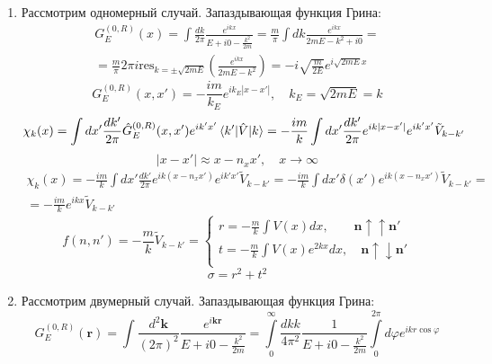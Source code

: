 \documentclass[12pt]{article}
\theoremstyle{definition}
\begin{document}
\begin{enumerate}
    \item Рассмотрим одномерный случай. Запаздывающая функция Грина:
    \begin{multline}
    G^{(0,R)}_E(x)=\int\frac{dk}{2\pi}\frac{e^{ikx}}{E+i0-\frac{k^2}{2m}}=\frac{m}{\pi}\int dk\frac{e^{ikx}}{2mE-k^2+i0}=\\=\frac{m}{\pi}2\pi i\text{res}_{k=\pm\sqrt{2mE}}\left(\frac{e^{ikx}}{2mE-k^2}\right)=-i\sqrt{\frac{m}{2E}}e^{i\sqrt{2mE}x}
    \end{multline}
    \begin{equation}
        G^{(0,R)}_E(x,x')=-\frac{im}{k_E}e^{ik_E|x-x'|},\quad k_E=\sqrt{2mE}=k
    \end{equation}
    \begin{equation}
        \chi_k(x)=\int dx'\frac{dk'}{2\pi}\hat{G}^{(0,R)}_E(x,x')e^{ik'x'}\braket{k'|\hat{V}|k}=-\frac{im}{k}\int dx'\frac{dk'}{2\pi}e^{ik|x-x'|}e^{ik'x'}\tilde{V}_{k-k'}
    \end{equation}
    \begin{equation}
        |x-x'|\approx x-n_xx',\quad x\rightarrow\infty
    \end{equation}
    \begin{multline}
        \chi_k(x)=-\frac{im}{k}\int dx'\frac{dk'}{2\pi}e^{ik(x-n_xx')}e^{ik'x'}\tilde{V}_{k-k'}=-\frac{im}{k}\int dx'\delta(x')e^{ik(x-n_xx')}\tilde{V}_{k-k'}=\\=-\frac{im}{k}e^{ikx}\tilde{V}_{k-k'}
    \end{multline}
    \begin{equation}
        \boxed{f(n,n')=-\frac{m}{k}\tilde{V}_{k-k'}=
        \begin{cases}
            r=-\frac{m}{k}\int V(x)dx,\quad\quad \textbf{n}\uparrow\uparrow\textbf{n}'\\
            t=-\frac{m}{k}\int V(x)e^{2kx}dx,\quad \textbf{n}\uparrow\downarrow\textbf{n}'\\
        \end{cases}}
    \end{equation}
    \begin{equation}
        \boxed{\sigma=r^2+t^2}
    \end{equation}
    \item Рассмотрим двумерный случай. Запаздывающая функция Грина:
    \begin{equation}
        G^{(0,R)}_E(\textbf{r})=\int\frac{d^2\textbf{k}}{(2\pi)^2}\frac{e^{i\textbf{k}\textbf{r}}}{E+i0-\frac{k^2}{2m}}=\int\limits_0^\infty\frac{dkk}{4\pi^2}\frac{1}{E+i0-\frac{k^2}{2m}}\int\limits_0^{2\pi} d\varphi e^{ikr\cos\varphi}

\end{equation}
\end{enumerate}
\end{document}
